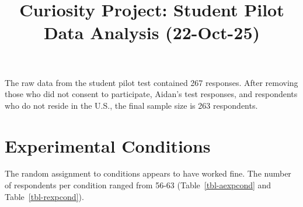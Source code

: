 \documentclass[
  letterpaper,
  DIV=11,
  numbers=noendperiod]{scrartcl}
\title{Curiosity Project: Student Pilot Data Analysis (22-Oct-25)}
\author{}
\date{}
\renewcommand*\contentsname{Table of contents}
\newcommand\contentsname{Table of contents}
\begin{document}
\maketitle


\renewcommand*\contentsname{Table of contents}
{
\hypersetup{linkcolor=}
\setcounter{tocdepth}{3}
\tableofcontents
}

The raw data from the student pilot test contained 267 responses. After
removing those who did not consent to participate, Aidan's test
responses, and respondents who do not reside in the U.S., the final
sample size is 263 respondents.

\section{Experimental Conditions}\label{experimental-conditions}

The random assignment to conditions appears to have worked fine. The
number of respondents per condition ranged from 56-63
(Table~\ref{tbl-aexpcond} and Table~\ref{tbl-rexpcond}).

\begin{table}

\caption{\label{tbl-aexpcond}Number of respondents in the control and
experimental conditions for the astronomy issue.}


\end{table}%
\end{document}
